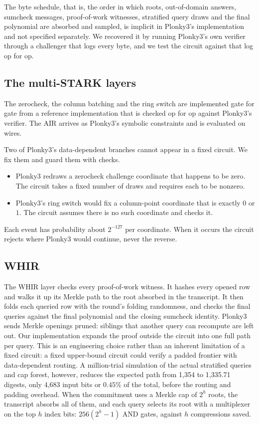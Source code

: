 \documentclass[11pt]{article}
\newcommand{\AND}{\textsf{AND}}
\begin{document}
The byte schedule, that is, the order in which roots, out-of-domain answers,
sumcheck messages, proof-of-work witnesses, stratified query draws and the final
polynomial are absorbed and sampled, is implicit in Plonky3's implementation and
not specified separately.
We recovered it by running Plonky3's own verifier through a challenger that logs
every byte, and we test the circuit against that log op for op.

\subsection{The multi-STARK layers}

The zerocheck, the column batching and the ring switch are implemented
gate for gate from a reference implementation that is checked op for op against
Plonky3's verifier. The AIR arrives as Plonky3's symbolic constraints and is
evaluated on wires.

Two of Plonky3's data-dependent branches cannot appear in a
fixed circuit. We fix them and guard them with checks.
\begin{itemize}
  \item Plonky3 redraws a zerocheck challenge coordinate that happens to be zero.
    The circuit takes a fixed number of draws and requires each to be nonzero.
  \item Plonky3's ring switch would fix a column-point coordinate that is
    exactly $0$ or $1$. The circuit assumes there is no such coordinate and
    checks it.
\end{itemize}
Each event has probability about $2^{-127}$ per coordinate. When it occurs the
circuit rejects where Plonky3 would continue, never the reverse.

\subsection{WHIR}

The WHIR layer checks every proof-of-work witness. It hashes every opened row and
walks it up its Merkle path to the root absorbed in the transcript. It then folds
each queried row with the round's folding randomness, and checks the final
queries against the final polynomial and the closing sumcheck identity. Plonky3 sends
Merkle openings pruned: siblings that another query can recompute are left out.
Our implementation expands the proof outside the circuit into one full path per
query. This is an engineering choice rather than an inherent limitation of a
fixed circuit: a fixed upper-bound circuit could verify a padded frontier with
data-dependent routing. A million-trial simulation of the actual stratified
queries and cap forest, however, reduces the expected path from 1{,}354 to
1{,}335.71 digests, only 4{,}683 input bits or $0.45\%$ of the total, before the
routing and padding overhead. When the commitment uses a Merkle cap of $2^h$
roots, the transcript
absorbs all of them, and each query selects its root with a multiplexer on the
top $h$ index bits: $256(2^h-1)$ \AND{} gates, against $h$ compressions saved.
\end{document}
